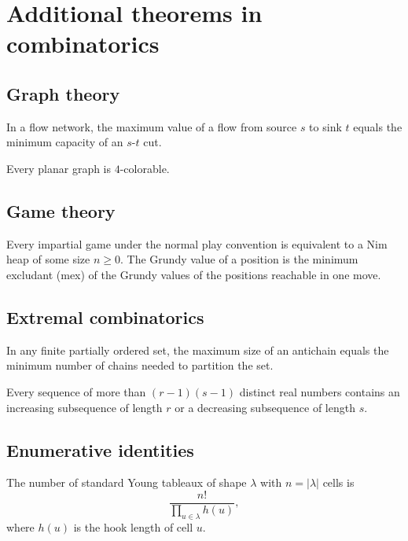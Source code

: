 \documentclass[11pt]{scrartcl}
\begin{document}
\section{Additional theorems in combinatorics}
\subsection{Graph theory}
\begin{theorem}
  In a flow network, the maximum value of a flow
  from source $s$ to sink $t$ equals the minimum capacity
  of an $s$-$t$ cut.
\end{theorem}

\begin{theorem}
  Every planar graph is $4$-colorable.
\end{theorem}

\subsection{Game theory}
\begin{theorem}
  Every impartial game under the normal play convention
  is equivalent to a Nim heap of some size $n \ge 0$.
  The Grundy value of a position is the minimum excludant (mex)
  of the Grundy values of the positions reachable in one move.
\end{theorem}

\subsection{Extremal combinatorics}
\begin{theorem}
  In any finite partially ordered set,
  the maximum size of an antichain equals
  the minimum number of chains needed to partition the set.
\end{theorem}

\begin{theorem}
  Every sequence of more than $(r-1)(s-1)$ distinct real numbers
  contains an increasing subsequence of length $r$
  or a decreasing subsequence of length $s$.
\end{theorem}

\subsection{Enumerative identities}
\begin{theorem}
  The number of standard Young tableaux of shape $\lambda$ with $n = |\lambda|$ cells is
  \[ \frac{n!}{\prod_{u \in \lambda} h(u)}, \]
  where $h(u)$ is the hook length of cell $u$.
\end{theorem}
\end{document}
